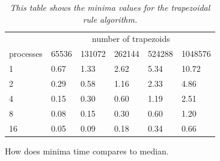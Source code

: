 \documentclass[a4paper,11pt,twoside]{article}
\begin{document}
\begin{table}[]
\centering
\caption{\textit{This table shows the minima values for the trapezoidal rule algorithm.}}
\label{tab:minima_trap}
\begin{tabular}{llllll}
\multicolumn{1}{l|}{}          & \multicolumn{5}{c}{number of trapezoids}                                                                                       \\ \cline{2-6} 
\multicolumn{1}{l|}{processes} & \multicolumn{1}{l|}{65536} & \multicolumn{1}{l|}{131072} & \multicolumn{1}{l|}{262144} & \multicolumn{1}{l|}{524288} & 1048576 \\ \hline
1                              & 0.67                       & 1.33                        & 2.62                        & 5.34                        & 10.72   \\
2                              & 0.29                       & 0.58                        & 1.16                        & 2.33                        & 4.86    \\
4                              & 0.15                       & 0.30                        & 0.60                        & 1.19                        & 2.51    \\
8                              & 0.08                       & 0.15                        & 0.30                        & 0.60                        & 1.20    \\
16                             & 0.05                       & 0.09                        & 0.18                        & 0.34                        & 0.66   
\end{tabular}
\end{table}


How does minima time compares to median.
\end{document}
